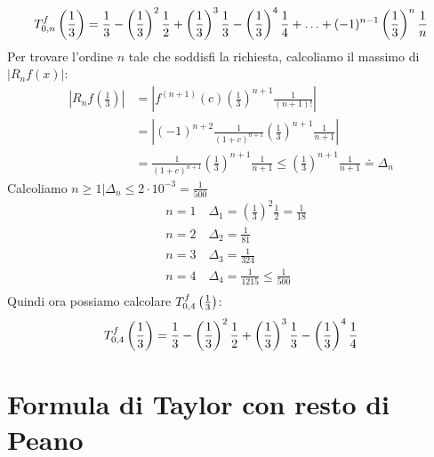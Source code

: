 \documentclass[12pt, a4paper]{report}
\begin{document}
                \begin{equation*}
                    \taylor{f}{0}{n}\left(\frac{1}{3}\right) = \frac{1}{3}-\left(\frac{1}{3}\right)^{2}\frac{1}{2}+\left(\frac{1}{3}\right)^{3}\frac{1}{3}-\left(\frac{1}{3}\right)^{4}\frac{1}{4}+\ldots+(-1)^{n-1}\left(\frac{1}{3}\right)^{n}\frac{1}{n}
                \end{equation*}
                Per trovare l'ordine $n$ tale che soddisfi la richiesta, calcoliamo il massimo di $|R_{n}f(x)|$:
                \begin{equation*}
                    \begin{split}
                        \left|R_{n}f\left(\frac{1}{3}\right)\right| &= \left|f^{(n+1)}(c)\left(\frac{1}{3}\right)^{n+1}\frac{1}{(n+1)!}\right| \\
                        &= \left|(-1)^{n+2}\frac{1}{(1+c)^{n+1}}\left(\frac{1}{3}\right)^{n+1}\frac{1}{n+1}\right| \\
                        &= \frac{1}{(1+c)^{n+1}}\left(\frac{1}{3}\right)^{n+1}\frac{1}{n+1} \leq \left(\frac{1}{3}\right)^{n+1}\frac{1}{n+1}\doteq \Delta_{n}
                    \end{split}
                \end{equation*}
                Calcoliamo $n\geq 1|\Delta_{n}\leq 2\cdot 10^{-3} = \frac{1}{500}$
                \begin{equation*}
                    \begin{split}
                        &n=1 \quad \Delta_{1} = \left(\frac{1}{3}\right)^{2}\frac{1}{2} = \frac{1}{18} \\
                        &n=2 \quad \Delta_{2} = \frac{1}{81} \\
                        &n=3 \quad \Delta_{3} = \frac{1}{324} \\
                        &n=4 \quad \Delta_{4} = \frac{1}{1215} \leq \frac{1}{500}\\
                    \end{split}
                \end{equation*}
                Quindi ora possiamo calcolare $\taylor{f}{0}{4}\left(\frac{1}{3}\right)$:
                \begin{equation*}
                    \taylor{f}{0}{4}\left(\frac{1}{3}\right) = \frac{1}{3}-\left(\frac{1}{3}\right)^{2}\frac{1}{2}+\left(\frac{1}{3}\right)^{3}\frac{1}{3}-\left(\frac{1}{3}\right)^{4}\frac{1}{4}
                \end{equation*}
    \section{Formula di Taylor con resto di Peano}
\end{document}

